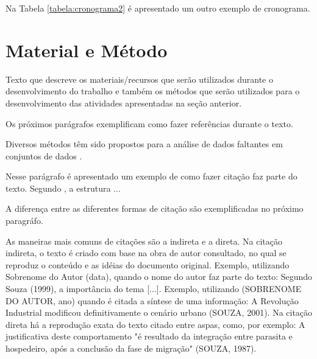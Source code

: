 \documentclass[
    12pt,               %
    a4paper,            %
    english,            %
    brazil,             %
    ]{article}
\begin{document}
 Na Tabela \ref{tabela:cronograma2} é apresentado um outro exemplo de cronograma.



\section{Material e Método}

Texto que descreve os materiais/recursos que serão utilizados durante o desenvolvimento do trabalho
e também os métodos que serão utilizados para o desenvolvimento das atividades apresentadas na seção
anterior.

Os próximos  parágrafos exemplificam como fazer referências durante o texto.

Diversos métodos têm sido propostos para a análise de dados faltantes em conjuntos de dados \cite{williams2014}.

Nesse parágrafo é apresentado um exemplo de como fazer citação faz parte do texto. Segundo , a estrutura ...

A diferença entre as diferentes formas de citação são exemplificadas no próximo paragráfo.

As maneiras mais comuns de citações são a indireta e a direta. Na citação indireta, o texto é criado com base na obra de autor consultado,
no qual se reproduz o conteúdo e as idéias do documento original. Exemplo, utilizando Sobrenome do Autor (data), quando o nome do autor
faz parte do texto: Segundo Souza (1999), a importância do tema [...]. Exemplo, utilizando (SOBRENOME DO AUTOR, ano) quando é citada a
síntese de uma informação: A Revolução Industrial modificou definitivamente o cenário urbano (SOUZA, 2001). Na citação direta há a
reprodução exata do texto citado entre aspas, como, por exemplo: A justificativa deste comportamento "é resultado da integração entre
parasita e hospedeiro, após a conclusão da fase de migração" (SOUZA, 1987).
\end{document}
